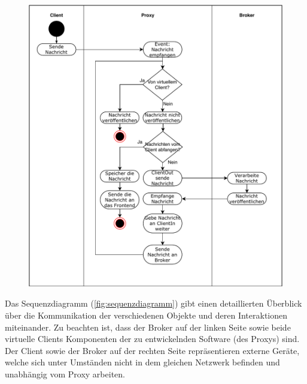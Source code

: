     \begin{figure}[!h]%
        \centering
        \includegraphics[width=14cm]{tex/bilder/4_konzept/Activity_Message.pdf}
        \label{fig:aktivitaetsdiagramm_message}
    \end{figure}
    
    Das Sequenzdiagramm (\ref{fig:sequenzdiagramm}) gibt einen detaillierten Überblick über die Kommunikation der verschiedenen Objekte und deren Interaktionen miteinander.
    Zu beachten ist, dass der Broker auf der linken Seite sowie beide virtuelle Clients Komponenten der zu entwickelnden Software (des Proxys) sind.
    Der Client sowie der Broker auf der rechten Seite repräsentieren externe Geräte, welche sich unter Umständen nicht in dem gleichen Netzwerk befinden und unabhängig vom Proxy arbeiten.
    
